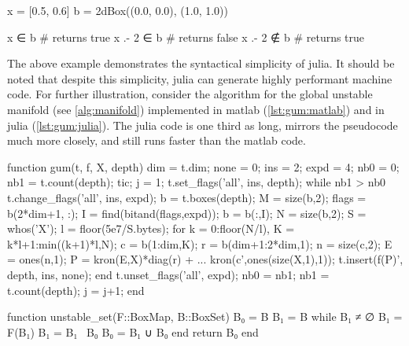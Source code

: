 \begin{minipage}{\linewidth}
\begin{jllisting}[language=julia, style=jlcodestyle]
    x = [0.5, 0.6]
    b = 2dBox((0.0, 0.0), (1.0, 1.0))

    x ∈ b           # returns true
    x .- 2 ∈ b      # returns false
    x .- 2 ∉ b      # returns true
\end{jllisting}
\end{minipage}

The above example demonstrates the syntactical simplicity of julia. 
It should be noted that despite this simplicity, julia can generate highly performant 
machine code. For further illustration, consider the algorithm for the global unstable 
manifold (see \autoref{alg:manifold}) implemented in matlab (\autoref{lst:gum:matlab}) 
and in julia (\autoref{lst:gum:julia}). The julia code is one third as long, mirrors 
the pseudocode much more closely, and still runs faster than the matlab code.

\begin{jllisting}[float, language=matlab, style=jlcodestyle, label=lst:gum:matlab, caption=Unstable manifold algorithm in matlab]
    function gum(t, f, X, depth)
    dim = t.dim;
    none = 0; ins = 2; expd = 4;             %
    nb0 = 0;  nb1 = t.count(depth);          %
    tic; j = 1;
    t.set_flags('all', ins, depth);
    while nb1 > nb0                          %
    t.change_flags('all', ins, expd);        %
    b = t.boxes(depth); M = size(b,2);       %
    flags = b(2*dim+1, :); 
    I = find(bitand(flags,expd));            %
    b = b(:,I); N = size(b,2);
    S = whos('X'); l = floor(5e7/S.bytes);
    for k = 0:floor(N/l),                    %
        K = k*l+1:min((k+1)*l,N);
        c = b(1:dim,K);                      %
        r = b(dim+1:2*dim,1);                %
        n = size(c,2); E = ones(n,1);
        P = kron(E,X)*diag(r) + ...          %
            kron(c',ones(size(X,1),1));
        t.insert(f(P)', depth, ins, none);   %
    end
    t.unset_flags('all', expd);              %
    nb0 = nb1; nb1 = t.count(depth);
    j = j+1;
    end
\end{jllisting}

\begin{jllisting}[float, language=julia, style=jlcodestyle, label=lst:gum:julia, caption=Unstable manifold algorithm in julia]
    function unstable_set(F::BoxMap, B::BoxSet)
        B₀ = B
        B₁ = B
        while B₁ ≠ ∅
            B₁ = F(B₁)
            B₁ = B₁ \ B₀
            B₀ = B₁ ∪ B₀
        end
        return B₀
    end
\end{jllisting}

